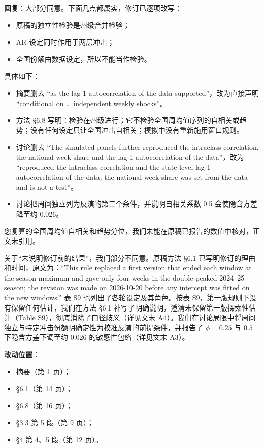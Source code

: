 \documentclass[UTF8,a4paper,11pt,fontset=none]{ctexart}
\providecommand{\tightlist}{\setlength{\itemsep}{1pt}\setlength{\parskip}{0pt}}
\begin{document}
\textbf{回复}：大部分同意。下面几点都属实，修订已逐项改写：

\begin{itemize}
\tightlist
\item
  原稿的独立性检验是州级合并检验；
\item
  AR 设定同时作用于两层冲击；
\item
  全国份额由数据设定，所以不能当作检验。
\end{itemize}

具体如下：

\begin{itemize}
\tightlist
\item
  摘要删去 ``as the lag-1 autocorrelation of the data supported''，改为直接声明 ``conditional on \ldots{} independent weekly shocks''。
\item
  方法 §6.8 写明：检验在州级进行；它不检验全国周均值序列的自相关或趋势；没有任何设定只让全国冲击自相关；模拟中没有重新施用窗口规则。
\item
  讨论删去 ``The simulated panels further reproduced the intraclass correlation, the national-week share and the lag-1 autocorrelation of the data''，改为 ``reproduced the intraclass correlation and the state-level lag-1 autocorrelation of the data; the national-week share was set from the data and is not a test''。
\item
  讨论把周间独立列为反演的第二个条件，并说明自相关系数 0.5 会使隐含方差降至约 0.026。
\end{itemize}

您复算的全国周均值自相关和趋势分位，我们未能在原稿已报告的数值中核对，正文未引用。

关于``未说明修订前的结果''，我们部分不同意。原稿方法 §6.1 已写明修订的理由和时间，原文为：``This rule replaced a first version that ended each window at the season maximum and gave only four weeks in the double-peaked 2024--25 season; the revision was made on 2026-10-20 before any intercept was fitted on the new windows.'' 表 S9 也列出了各轮设定及其角色。按表 S9，第一版规则下没有保留任何估计，我们在方法 §6.1 补写了明确说明，澄清未保留第一版探索性估计（Table S9），彻底消除了口径歧义（详见文末 A4）。我们在讨论局限中将周间独立与特定冲击份额明确定性为校准反演的前提条件，并报告了 $\phi=0.25$ 与 $0.5$ 下隐含方差下调至约 0.026 的敏感性包络（详见文末 A3）。

\textbf{改动位置}：

\begin{itemize}
\tightlist
\item
  摘要（第 1 页）；
\item
  §6.1（第 14 页）；
\item
  §6.8（第 16 页）；
\item
  §3.3 第 5 段（第 9 页）；
\item
  §4 第 4、5 段（第 12 页）。
\end{itemize}
\end{document}
